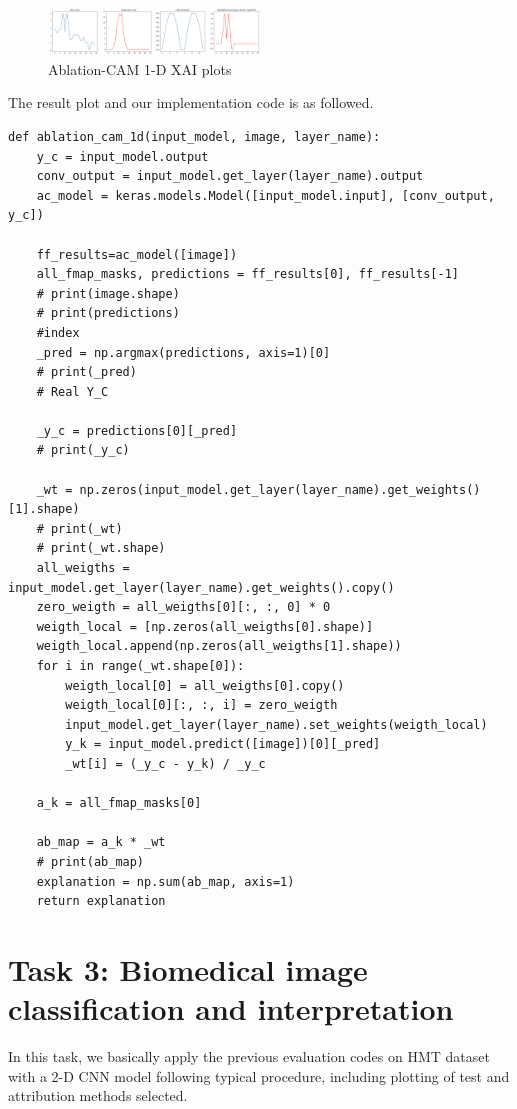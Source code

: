 \documentclass[conference]{IEEEtran}
\begin{document}
\begin{figure}[h] 
    \centering
    \includegraphics[width=0.5\textwidth]{./graphs/abd.png}
    \caption{Ablation-CAM 1-D XAI plots} 
\end{figure}

The result plot and our implementation code is as followed.

\begin{lstlisting}
def ablation_cam_1d(input_model, image, layer_name):
    y_c = input_model.output
    conv_output = input_model.get_layer(layer_name).output
    ac_model = keras.models.Model([input_model.input], [conv_output, y_c])

    ff_results=ac_model([image])
    all_fmap_masks, predictions = ff_results[0], ff_results[-1]
    # print(image.shape)
    # print(predictions)
    #index
    _pred = np.argmax(predictions, axis=1)[0]
    # print(_pred)
    # Real Y_C

    _y_c = predictions[0][_pred]
    # print(_y_c)

    _wt = np.zeros(input_model.get_layer(layer_name).get_weights()[1].shape)
    # print(_wt)
    # print(_wt.shape)
    all_weigths = input_model.get_layer(layer_name).get_weights().copy()
    zero_weigth = all_weigths[0][:, :, 0] * 0
    weigth_local = [np.zeros(all_weigths[0].shape)]
    weigth_local.append(np.zeros(all_weigths[1].shape))
    for i in range(_wt.shape[0]):
        weigth_local[0] = all_weigths[0].copy()
        weigth_local[0][:, :, i] = zero_weigth
        input_model.get_layer(layer_name).set_weights(weigth_local)
        y_k = input_model.predict([image])[0][_pred]
        _wt[i] = (_y_c - y_k) / _y_c

    a_k = all_fmap_masks[0]

    ab_map = a_k * _wt
    # print(ab_map)
    explanation = np.sum(ab_map, axis=1)
    return explanation
\end{lstlisting}

\section{Task 3: Biomedical image classification and interpretation}
In this task, we basically apply the previous evaluation codes on HMT dataset with a 2-D CNN model following typical procedure, including plotting of test and attribution methods selected.
\end{document}
